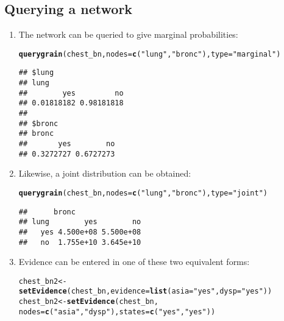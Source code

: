 \documentclass[10pt]{article}\usepackage[]{graphicx}\usepackage[]{color}
\makeatletter
\newcommand{\hlstr}[1]{\textcolor[rgb]{0.192,0.494,0.8}{#1}}%
\newcommand{\hlstd}[1]{\textcolor[rgb]{0.345,0.345,0.345}{#1}}%
\newcommand{\hlkwb}[1]{\textcolor[rgb]{0.69,0.353,0.396}{#1}}%
\newcommand{\hlkwc}[1]{\textcolor[rgb]{0.333,0.667,0.333}{#1}}%
\newcommand{\hlkwd}[1]{\textcolor[rgb]{0.737,0.353,0.396}{\textbf{#1}}}%
\newenvironment{kframe}{%
 \def\at@end@of@kframe{}%
 \ifinner\ifhmode%
  \def\at@end@of@kframe{\end{minipage}}%
  \begin{minipage}{\columnwidth}%
 \fi\fi%
 \def\FrameCommand##1{\hskip\@totalleftmargin \hskip-\fboxsep
 \colorbox{shadecolor}{##1}\hskip-\fboxsep
     \hskip-\linewidth \hskip-\@totalleftmargin \hskip\columnwidth}%
 \MakeFramed {\advance\hsize-\width
   \@totalleftmargin\z@ \linewidth\hsize
   \@setminipage}}%
 {\par\unskip\endMakeFramed%
 \at@end@of@kframe}
\newenvironment{knitrout}{}{} %
\makeatother
\begin{document}
\subsection{Querying a network}
\label{sec:querying-network}

\begin{enumerate}
\item The network can be queried to give marginal probabilities:

\begin{knitrout}
\color{fgcolor}\begin{kframe}
\begin{alltt}
\hlkwd{querygrain}\hlstd{(chest_bn,} \hlkwc{nodes}\hlstd{=}\hlkwd{c}\hlstd{(}\hlstr{"lung"}\hlstd{,} \hlstr{"bronc"}\hlstd{),} \hlkwc{type}\hlstd{=}\hlstr{"marginal"}\hlstd{)}
\end{alltt}
\begin{verbatim}
## $lung
## lung
##        yes         no 
## 0.01818182 0.98181818 
## 
## $bronc
## bronc
##       yes        no 
## 0.3272727 0.6727273
\end{verbatim}
\end{kframe}
\end{knitrout}

\item Likewise, a joint distribution can be obtained:

\begin{knitrout}
\color{fgcolor}\begin{kframe}
\begin{alltt}
\hlkwd{querygrain}\hlstd{(chest_bn,}\hlkwc{nodes}\hlstd{=}\hlkwd{c}\hlstd{(}\hlstr{"lung"}\hlstd{,} \hlstr{"bronc"}\hlstd{),} \hlkwc{type}\hlstd{=}\hlstr{"joint"}\hlstd{)}
\end{alltt}
\begin{verbatim}
##      bronc
## lung        yes        no
##   yes 4.500e+08 5.500e+08
##   no  1.755e+10 3.645e+10
\end{verbatim}
\end{kframe}
\end{knitrout}

\item Evidence can be entered in one of these two equivalent forms:

\begin{knitrout}
\color{fgcolor}\begin{kframe}
\begin{alltt}
\hlstd{chest_bn2}  \hlkwb{<-} \hlkwd{setEvidence}\hlstd{(chest_bn,} \hlkwc{evidence}\hlstd{=}\hlkwd{list}\hlstd{(}\hlkwc{asia}\hlstd{=}\hlstr{"yes"}\hlstd{,} \hlkwc{dysp}\hlstd{=}\hlstr{"yes"}\hlstd{))}
\hlstd{chest_bn2}  \hlkwb{<-} \hlkwd{setEvidence}\hlstd{(chest_bn,}
                      \hlkwc{nodes}\hlstd{=}\hlkwd{c}\hlstd{(}\hlstr{"asia"}\hlstd{,} \hlstr{"dysp"}\hlstd{),} \hlkwc{states}\hlstd{=}\hlkwd{c}\hlstd{(}\hlstr{"yes"}\hlstd{,} \hlstr{"yes"}\hlstd{))}
\end{alltt}
\end{kframe}
\end{knitrout}


\end{enumerate}
\end{document}
